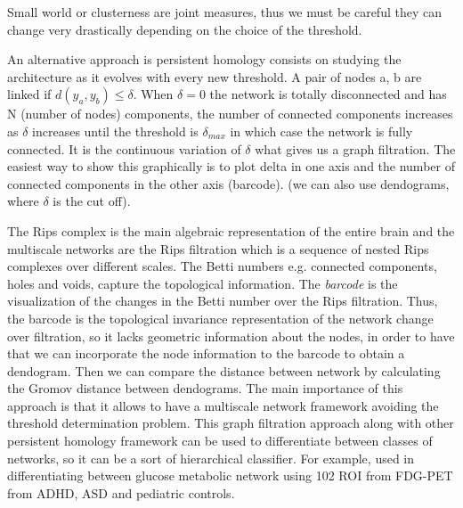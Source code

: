 \documentclass[onecollarge,runningheads]{svjour2}
\begin{document}
Small world or clusterness are joint measures, thus we must be careful they can change very drastically depending on the choice of the threshold. %


An alternative approach is persistent homology consists on studying the architecture as it evolves with every new threshold.
A pair of nodes a, b are linked if $d(y_a, y_b) \leq \delta$. When $\delta = 0$ the network is totally disconnected and has N (number of nodes) components, the number of connected components increases as $\delta$ increases until the threshold is $\delta_{max}$ in which case the network is fully connected. It is the continuous variation of $\delta$ what gives us a graph filtration. The easiest way to show this graphically is to plot delta in one axis and the number of connected components in the other axis (barcode). (we can also use dendograms, where $\delta$ is the cut off). 

The Rips complex is the main algebraic representation of the entire brain and the multiscale networks are the Rips filtration which is a sequence of nested Rips complexes over different scales. The Betti numbers e.g. connected components, holes and voids, capture the topological information. 
The \textit{barcode} is the visualization of the changes in the Betti number over the Rips filtration. Thus, the barcode is the topological invariance representation of the network change over filtration, so it lacks geometric information about the nodes, in order to have that we can incorporate the node information to the barcode to obtain a dendogram. Then we can compare the distance between network by calculating the Gromov distance between dendograms.
The main importance of this approach is that it allows to have a multiscale network framework avoiding the threshold determination problem.
This graph filtration approach along with other persistent homology framework can be used to differentiate between classes of networks, so it can be a sort of hierarchical classifier. For example, used in differentiating between glucose metabolic network using 102 ROI from FDG-PET from ADHD, ASD and pediatric controls.
\end{document}
